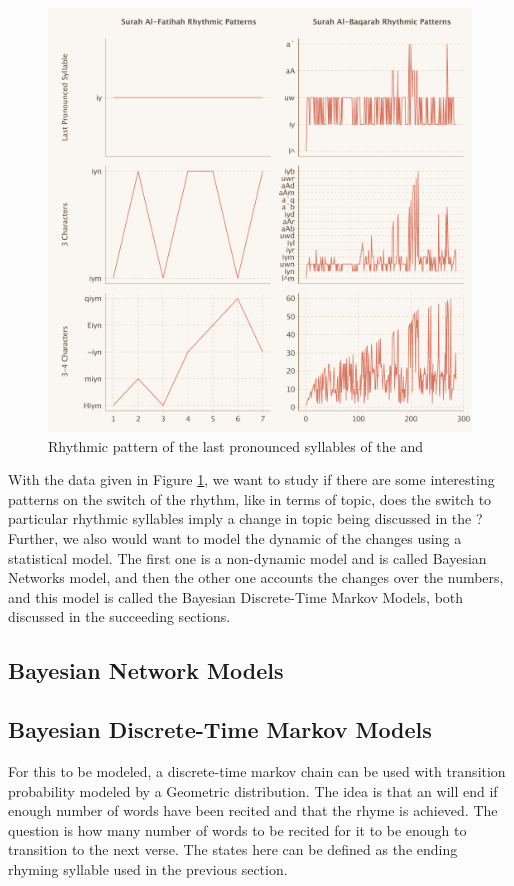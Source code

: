 \begin{figure}[!t]
    \includegraphics[width=\textwidth]{img/plot_rhythmic1.pdf}
    \caption{Rhythmic pattern of the last pronounced syllables of the   and  }
    \label{fig:fatihah_baqarah_rhythmic_method}
\end{figure}

With the data given in Figure \ref{fig:fatihah_baqarah_rhythmic_method}, we want to study if there are some interesting patterns on the switch of the rhythm, like in terms of topic, does the switch to particular rhythmic syllables imply a change in topic being discussed in the  ? Further, we also would want to model the dynamic of the changes using a statistical model. The first one is a non-dynamic model and is called Bayesian Networks model, and then the other one accounts the changes over the   numbers, and this model is called the Bayesian Discrete-Time Markov Models, both discussed in the succeeding sections.
\subsection{Bayesian Network Models}

\subsection{Bayesian Discrete-Time Markov Models}
For this to be modeled, a discrete-time markov chain can be used with transition probability modeled by a Geometric distribution. The idea is that an   will end if enough number of words have been recited and that the rhyme is achieved. The question is how many number of words to be recited for it to be enough to transition to the next verse. The states here can be defined as the ending rhyming syllable used in the previous section. 

